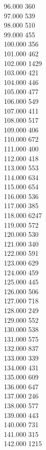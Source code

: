 { 96.000	360 \\
 97.000	539 \\
 98.000	510 \\
 99.000	455 \\
 100.000	356 \\
 101.000	462 \\
 102.000	1429 \\
 103.000	421 \\
 104.000	446 \\
 105.000	477 \\
 106.000	549 \\
 107.000	411 \\
 108.000	517 \\
 109.000	406 \\
 110.000	672 \\
 111.000	400 \\
 112.000	418 \\
 113.000	553 \\
 114.000	634 \\
 115.000	654 \\
 116.000	536 \\
 117.000	385 \\
 118.000	6247 \\
 119.000	572 \\
 120.000	530 \\
 121.000	340 \\
 122.000	591 \\
 123.000	629 \\
 124.000	459 \\
 125.000	445 \\
 126.000	506 \\
 127.000	718 \\
 128.000	249 \\
 129.000	552 \\
 130.000	538 \\
 131.000	575 \\
 132.000	837 \\
 133.000	339 \\
 134.000	431 \\
 135.000	609 \\
 136.000	647 \\
 137.000	246 \\
 138.000	577 \\
 139.000	443 \\
 140.000	731 \\
 141.000	315 \\
 142.000	1215 \\
}

